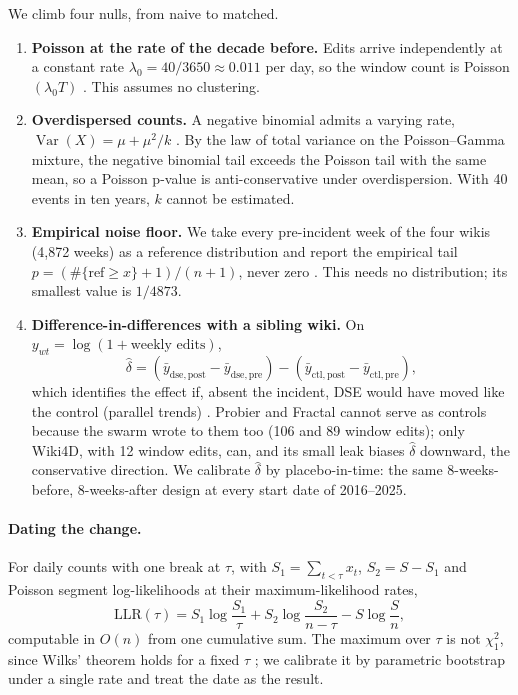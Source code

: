 \documentclass[10pt,a4paper]{article}
\begin{document}
We climb four nulls, from naive to matched.
\begin{enumerate}
\item \textbf{Poisson at the rate of the decade before.} Edits arrive independently at a constant rate $\lambda_0 = 40/3650 \approx 0.011$ per day, so the window count is Poisson$(\lambda_0 T)$ \citep[ch.~11]{wasserman2004all}. This assumes no clustering.
\item \textbf{Overdispersed counts.} A negative binomial admits a varying rate, $\operatorname{Var}(X) = \mu + \mu^2/k$ \citep[\S17.2]{gelman2013bda}. By the law of total variance on the Poisson--Gamma mixture, the negative binomial tail exceeds the Poisson tail with the same mean, so a Poisson p-value is anti-conservative under overdispersion. With 40 events in ten years, $k$ cannot be estimated.
\item \textbf{Empirical noise floor.} We take every pre-incident week of the four wikis (4,872 weeks) as a reference distribution and report the empirical tail $p = (\#\{\text{ref} \ge x\} + 1)/(n+1)$, never zero \citep{phipson2010permutation}. This needs no distribution; its smallest value is $1/4873$.
\item \textbf{Difference-in-differences with a sibling wiki.} On $y_{wt} = \log(1 + \text{weekly edits})$,
\begin{equation}
\hat\delta = (\bar y_{\mathrm{dse,post}} - \bar y_{\mathrm{dse,pre}}) - (\bar y_{\mathrm{ctl,post}} - \bar y_{\mathrm{ctl,pre}}),
\end{equation}
which identifies the effect if, absent the incident, DSE would have moved like the control (parallel trends) \citep[ch.~19]{wasserman2004all}. Probier and Fractal cannot serve as controls because the swarm wrote to them too (106 and 89 window edits); only Wiki4D, with 12 window edits, can, and its small leak biases $\hat\delta$ downward, the conservative direction. We calibrate $\hat\delta$ by placebo-in-time: the same 8-weeks-before, 8-weeks-after design at every start date of 2016--2025.
\end{enumerate}

\paragraph{Dating the change.} For daily counts with one break at $\tau$, with $S_1 = \sum_{t<\tau} x_t$, $S_2 = S - S_1$ and Poisson segment log-likelihoods at their maximum-likelihood rates,
\begin{equation}
\mathrm{LLR}(\tau) = S_1 \log\frac{S_1}{\tau} + S_2 \log\frac{S_2}{n-\tau} - S \log\frac{S}{n},
\end{equation}
computable in $O(n)$ from one cumulative sum. The maximum over $\tau$ is not $\chi^2_1$, since Wilks' theorem holds for a fixed $\tau$ \citep[\S11.1]{cryer2008time}; we calibrate it by parametric bootstrap under a single rate and treat the date as the result.
\end{document}

